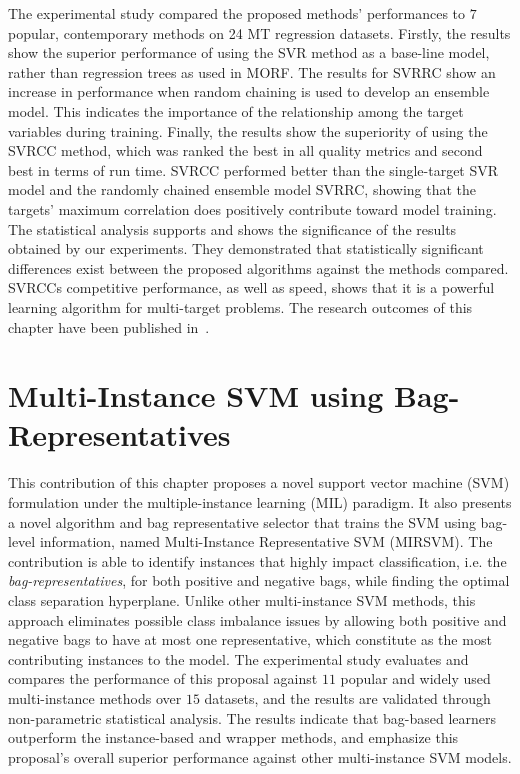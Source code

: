 \documentclass[reqno]{vcuthesis}
\numberwithin{equation}{chapter}
\begin{document}
The experimental study compared the proposed methods' performances to $7$ popular, contemporary methods on 24 MT regression datasets. Firstly, the results show the superior performance of using the SVR method as a base-line model, rather than regression trees as used in MORF. The results for SVRRC show an increase in performance when random chaining is used to develop an ensemble model. This indicates the importance of the relationship among the target variables during training. Finally, the results show the superiority of using the SVRCC method, which was ranked the best in all quality metrics and second best in terms of run time. SVRCC performed better than the single-target SVR model and the randomly chained ensemble model SVRRC, showing that the targets' maximum correlation does positively contribute toward model training. The statistical analysis supports and shows the significance of the results obtained by our experiments. They demonstrated that statistically significant differences exist between the proposed algorithms against the methods compared. SVRCCs competitive performance, as well as speed, shows that it is a powerful learning algorithm for multi-target problems. The research outcomes of this chapter have been published in~\cite{melki2017multi}.

\chapter{Multi-Instance SVM using Bag-Representatives \label{chap:mirsvm}}
This contribution of this chapter proposes a novel support vector machine (SVM) formulation under the multiple-instance learning (MIL) paradigm. It also presents a novel algorithm and  bag representative selector that trains the SVM using bag-level information, named Multi-Instance Representative SVM (MIRSVM). The contribution is able to identify instances that highly impact classification, i.e. the \textit{bag-representatives}, for both positive and negative bags, while finding the optimal class separation hyperplane. Unlike other multi-instance SVM methods, this approach eliminates possible class imbalance issues by allowing both positive and negative bags to have at most one representative, which constitute as the most contributing instances to the model. The experimental study evaluates and compares the performance of this proposal against $11$ popular and widely used multi-instance methods over $15$ datasets, and the results are validated through non-parametric statistical analysis. The results indicate that bag-based learners outperform the instance-based and wrapper methods, and emphasize this proposal's overall superior performance against other multi-instance SVM models. 
\end{document}
